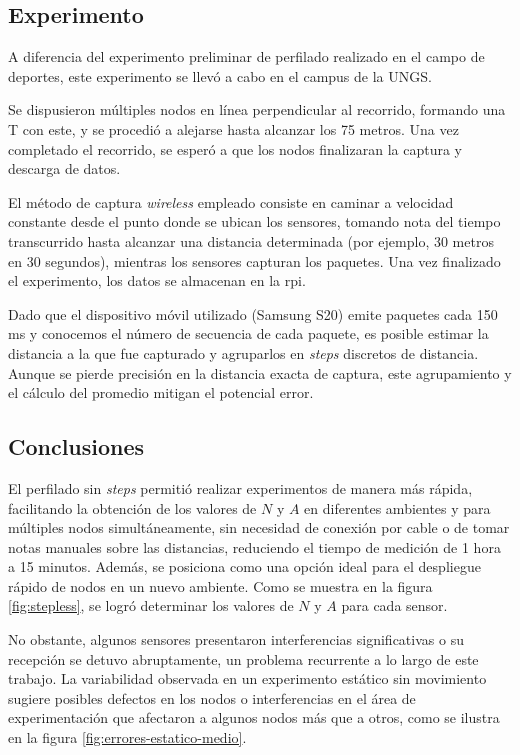 \subsection{Experimento}


A diferencia del experimento preliminar de perfilado realizado en el campo de deportes, este experimento se llevó a cabo en el campus de la UNGS.

Se dispusieron múltiples nodos en línea perpendicular al recorrido, formando una T con este, y se procedió a alejarse hasta alcanzar los 75 metros. Una vez completado el recorrido, se esperó a que los nodos finalizaran la captura y descarga de datos.

El método de captura \textit{wireless} empleado consiste en caminar a velocidad constante desde el punto donde se ubican los sensores, tomando nota del tiempo transcurrido hasta alcanzar una distancia determinada (por ejemplo, 30 metros en 30 segundos), mientras los sensores capturan los paquetes. Una vez finalizado el experimento, los datos se almacenan en la \acs{rpi}.

Dado que el dispositivo móvil utilizado (Samsung S20) emite paquetes cada 150 ms y conocemos el número de secuencia de cada paquete, es posible estimar la distancia a la que fue capturado y agruparlos en \textit{steps} discretos de distancia. Aunque se pierde precisión en la distancia exacta de captura, este agrupamiento y el cálculo del promedio mitigan el potencial error.

\subsection{Conclusiones}

El perfilado sin \textit{steps} permitió realizar experimentos de manera más rápida, facilitando la obtención de los valores de \(N\) y \(A\) en diferentes ambientes y para múltiples nodos simultáneamente, sin necesidad de conexión por cable o de tomar notas manuales sobre las distancias, reduciendo el tiempo de medición de 1 hora a 15 minutos. Además, se posiciona como una opción ideal para el despliegue rápido de nodos en un nuevo ambiente. Como se muestra en la figura \ref{fig:stepless}, se logró determinar los valores de \(N\) y \(A\) para cada sensor.

No obstante, algunos sensores presentaron interferencias significativas o su recepción se detuvo abruptamente, un problema recurrente a lo largo de este trabajo. La variabilidad observada en un experimento estático sin movimiento sugiere posibles defectos en los nodos o interferencias en el área de experimentación que afectaron a algunos nodos más que a otros, como se ilustra en la figura \ref{fig:errores-estatico-medio}.


